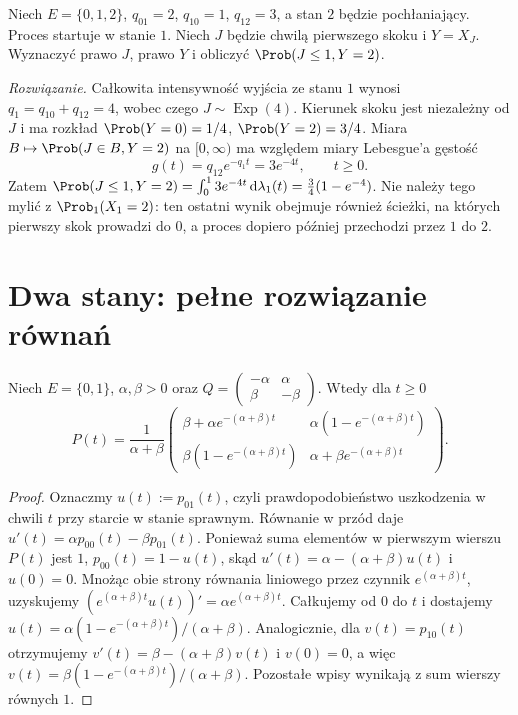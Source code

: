 \begin{zadanie}
Niech $E=\{0,1,2\}$, $q_{01}=2$, $q_{10}=1$,
$q_{12}=3$, a stan $2$ będzie pochłaniający.
Proces startuje w stanie $1$. Niech $J$ będzie chwilą
pierwszego skoku i $Y=X_J$. Wyznaczyć prawo $J$, prawo
$Y$ i obliczyć $\Prob(J\le1,Y=2)$.

\emph{Rozwiązanie.} Całkowita intensywność wyjścia ze
stanu $1$ wynosi $q_1=q_{10}+q_{12}=4$, wobec czego
$J\sim\operatorname{Exp}(4)$. Kierunek skoku jest
niezależny od $J$ i ma rozkład
$\Prob(Y=0)=1/4$, $\Prob(Y=2)=3/4$.
Miara $B\mapsto\Prob(J\in B,Y=2)$ na $[0,\infty)$
ma względem miary Lebesgue'a gęstość
\[
g(t)=q_{12}e^{-q_1t}=3e^{-4t},\qquad t\ge0.
\]
Zatem
$\Prob(J\le1,Y=2)=\int_0^1 3e^{-4t}\,\mathrm d\lambda_1(t)
=\tfrac34(1-e^{-4})$.
Nie należy tego mylić z $\Prob_1(X_1=2)$:
ten ostatni wynik obejmuje również ścieżki, na których
pierwszy skok prowadzi do $0$, a proces dopiero później
przechodzi przez $1$ do $2$.
\end{zadanie}

\section{Dwa stany: pełne rozwiązanie równań}
\begin{twierdzenie}
Niech $E=\{0,1\}$, $\alpha,\beta>0$ oraz
$Q=\left(\begin{smallmatrix}-\alpha&\alpha\\
\beta&-\beta\end{smallmatrix}\right)$.
Wtedy dla $t\ge0$
\[
P(t)=\frac1{\alpha+\beta}
\begin{pmatrix}
\beta+\alpha e^{-(\alpha+\beta)t} &
\alpha(1-e^{-(\alpha+\beta)t})\\
\beta(1-e^{-(\alpha+\beta)t})&
\alpha+\beta e^{-(\alpha+\beta)t}
\end{pmatrix}.
\]
\end{twierdzenie}
\begin{proof}
Oznaczmy $u(t):=p_{01}(t)$, czyli prawdopodobieństwo
uszkodzenia w chwili $t$ przy starcie w stanie sprawnym.
Równanie w przód daje
$u'(t)=\alpha p_{00}(t)-\beta p_{01}(t)$.
Ponieważ suma elementów w pierwszym wierszu $P(t)$ jest $1$,
$p_{00}(t)=1-u(t)$, skąd
$u'(t)=\alpha-(\alpha+\beta)u(t)$ i $u(0)=0$.
Mnożąc obie strony równania liniowego przez czynnik
$e^{(\alpha+\beta)t}$, uzyskujemy
$(e^{(\alpha+\beta)t}u(t))'=\alpha e^{(\alpha+\beta)t}$.
Całkujemy od $0$ do $t$ i dostajemy
$u(t)=\alpha(1-e^{-(\alpha+\beta)t})/(\alpha+\beta)$.
Analogicznie, dla $v(t)=p_{10}(t)$ otrzymujemy
$v'(t)=\beta-(\alpha+\beta)v(t)$ i $v(0)=0$,
a więc $v(t)=\beta(1-e^{-(\alpha+\beta)t})/(\alpha+\beta)$.
Pozostałe wpisy wynikają z sum wierszy równych $1$.
\end{proof}

